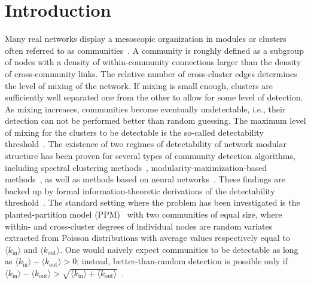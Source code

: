\documentclass[a4paper,pre,superscriptaddress,floatfix,nofootinbib,twocolumn]{revtex4-1}
\begin{document}
\maketitle

\section*{Introduction}

Many real networks display a mesoscopic organization
in modules or clusters often referred to as communities~\cite{fortunato2010community}. A
community is roughly defined as a subgroup of nodes with a
density of within-community connections
larger than the density of cross-community links.
The relative number of cross-cluster edges determines the level of mixing of the network.
If mixing is small enough, clusters are
sufficiently well separated one from the other to allow for some level of detection.
As mixing increases, communities become eventually undetectable, i.e., their detection
can not be performed better than random guessing.
The maximum level of mixing for the clusters to be detectable is the so-called
detectability threshold~\cite{reichardt2008detectable, decelle2011inference}.
The existence of two regimes of detectability of network modular structure
has been proven for several types of community detection algorithms, including
spectral clustering methods~\cite{nadakuditi2012graph, radicchi2013detectability, krzakala2013spectral, chen2015universal},
modularity-maximization-based methods~\cite{radicchi2014paradox},
as well as methods based on neural networks~\cite{kojaku2024network,kawamoto2018mean,chen2019supervised}.
These findings are backed up by
formal information-theoretic derivations of the detectability threshold~\cite{abbe2015community, abbe2016crossing, abbe2018community}.
The standard setting where the problem has been investigated is the
planted-partition model (PPM)~\cite{condon2001algorithms}
with two communities of equal size,
where within- and cross-cluster degrees of individual nodes are random variates extracted
from Poisson distributions with average
values respectively equal to $\langle k_{\text{in}} \rangle$ and $\langle k_{\text{out}} \rangle$.
One would naively expect communities to be detectable as long as
$\langle k_{\text{in}} \rangle - \langle k_{\text{out}} \rangle > 0$; instead, better-than-random
detection is possible only
if $\langle k_{\text{in}} \rangle - \langle k_{\text{out}} \rangle > \sqrt{\langle k_{\text{in}} \rangle + \langle k_{\text{out}} \rangle}$~\cite{decelle2011inference}.
\end{document}
